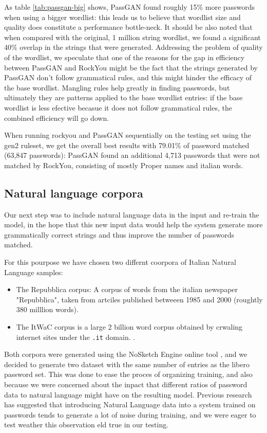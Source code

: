 As table \ref{tab:passgan-big} shows, PassGAN found roughly 15\% more passwords when using a bigger wordlist: this leads us to believe that wordlist size and quality does constitute a performance bottle-neck. It should be also noted that when compared with the original, 1 million string wordlist, we found a significant 40\% overlap in the strings that were generated. Addressing the problem of quality of the wordlist, we speculate that one of the reasons for the gap in efficiency between PassGAN and RockYou might be the fact that the strings generated by PassGAN don't follow grammatical rules, and this might hinder the efficacy of the base wordlist. Mangling rules help greatly in finding passwords, but ultimately they are patterns applied to the base wordlist entries: if the base wordlist is less efective becasue it does not follow grammatical rules, the combined efficiency will go down.

When running rockyou and PassGAN sequentially on the testing set using the gen2 ruleset, we get the overall best results with 79.01\% of password matched (63,847 passwords): PassGAN found an additional 4,713 passwords that were not matched by RockYou, consisting of mostly Proper names and italian words.

\subsection{Natural language corpora}
Our next step was to include natural language data in the input and re-train the model, in the hope that this new input data would help the system generate more grammatically correct strings and thus improve the number of passwords matched.

For this pourpose we have chosen two differnt coorpora of Italian Natural Language samples: 
\begin{itemize}
    \item The Repubblica corpus: A corpus of words from the italian newspaper "Repubblica", taken from artciles published betweeen 1985 and 2000 (roughtly 380 milllion words).\cite{repubblica_corpus}
    \item The ItWaC corpus is a large 2 billion word corpus obtained by crwaling internet sites under the \texttt{.it} domain. \cite{itwac_corpus}.  
\end{itemize}

Both corpora were generated using the NoSketch Engine online tool \cite{nosketch_engine}, and we decided to generate two dataset with the same number of entries as the libero password set. This was done to ease the proces of organizing training, and also because we were concerned about the inpact that different ratios of password data to natural language might have on the resulting model.
Previous research \cite{Melicher2016} has suggested that introducing Natural Language data into a system trained on passwords tends to generate a lot of noise during training, and we were eager to test weather this observation eld true in our testing.


